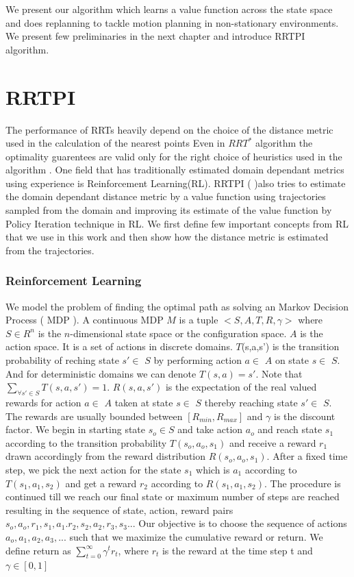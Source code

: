 \documentclass[MTech]{iitmdiss}
\begin{document}
We present our algorithm which learns a value function across the state space and does replanning to tackle motion planning in non-stationary environments. We present few preliminaries in the next chapter and introduce RRTPI algorithm.
 
 
\chapter{RRTPI}

The performance of RRTs heavily depend on the choice of the distance metric used in the calculation of the nearest points 
\cite{lav02}
 Even in $RRT^*$ algorithm the optimality guarentees are valid only for the right choice of heuristics used in the algorithm \cite{perez12} . One field that has traditionally estimated domain dependant metrics using experience is Reinforcement Learning(RL). RRTPI (\cite{rrtpi} )also tries to estimate the domain dependant distance metric by a value function using trajectories sampled from the domain and improving its estimate of the value function by Policy Iteration technique in RL. We first define few important concepts from RL that we use in this work and then show how the distance metric is estimated from the trajectories. 

\subsection{Reinforcement Learning}

We model the problem of finding the optimal path as solving an Markov Decision Process ( MDP ). A continuous MDP $M$ is a tuple $<S,A,T,R,\gamma>$ where $S \in R^{n}$ is the $n$-dimensional state space or the configuration space. $A$ is the action space. It is a set of actions in discrete domains. $T$(s,a,s') is the transition probability of reching state  $s' \in$ $S$ by performing action  $a \in$ $A$ on state  $s \in$ $S$. And for deterministic domains we can denote $T(s,a) = s'$. Note that 
$\sum_{\forall s' \in S } T(s,a,s') = 1$. $R(s,a,s')$ is the expectation of the real valued rewards for action  $a \in$ $A$  taken at state $s \in$ $S$ thereby reaching  state $s' \in$ $S$. The rewards are usually bounded between $[R_{min}, R_{max}]$ and $\gamma $ is the discount factor.
We begin in starting state $s_o \in S$ and take action $a_o$ and reach state $s_1$ according to the transition probability $T(s_o,a_o,s_1)$ and receive a reward $r_1$ drawn accordingly from the reward distribution $R(s_o, a_o, s_1)$. After a fixed time step, we pick the next action for the state $s_1$ which is $a_1$ according to $T(s_1, a_1, s_2)$ and get a reward $r_2$ according to $R(s_1, a_1, s_2)$. The procedure is continued till we reach our final state or maximum number of steps are reached resulting in the sequence of state, action, reward pairs $s_o, a_o,r_1, s_1,a_1.r_2,s_2, a_2,r_3,s_3... $ Our objective is to choose the sequence of actions $a_o, a_1, a_2 , a_3, ...$ such that we maximize the cumulative reward or return. We define return as $\displaystyle \sum_{t=0}^{\infty} \gamma^t r_t$, where $r_t $ is the reward at the time step t and $\gamma \in [0,1]$ 
\end{document}
